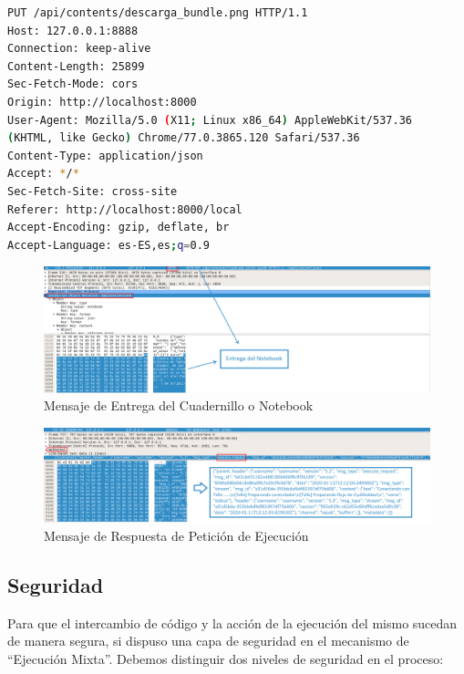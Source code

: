 \begin{lstlisting}[language=bash, caption=Ejemplo de la parte HTTP de los mensajes]
PUT /api/contents/descarga_bundle.png HTTP/1.1
Host: 127.0.0.1:8888
Connection: keep-alive
Content-Length: 25899
Sec-Fetch-Mode: cors
Origin: http://localhost:8000
User-Agent: Mozilla/5.0 (X11; Linux x86_64) AppleWebKit/537.36
(KHTML, like Gecko) Chrome/77.0.3865.120 Safari/537.36
Content-Type: application/json
Accept: */*
Sec-Fetch-Site: cross-site
Referer: http://localhost:8000/local
Accept-Encoding: gzip, deflate, br
Accept-Language: es-ES,es;q=0.9
\end{lstlisting}

\begin{figure}[!hbtp]  \centering\noindent
    \includegraphics[width=1.05\textwidth]{figures/notebook_put_request.png}
    \caption{Mensaje de Entrega del Cuadernillo o Notebook}
    \label{nb_put_req}
\end{figure}

\begin{figure}[!hbtp]  \centering\noindent
    \includegraphics[width=1.05\textwidth]{figures/execute_request.png}
    \caption{Mensaje de Respuesta de Petición de Ejecución }
    \label{exec_req}
\end{figure}

\subsection{Seguridad}

Para que el intercambio de código y la acción de la ejecución del mismo sucedan de manera segura, si dispuso una capa de seguridad en el mecanismo de ``Ejecución Mixta''. Debemos distinguir dos niveles de seguridad en el proceso:

